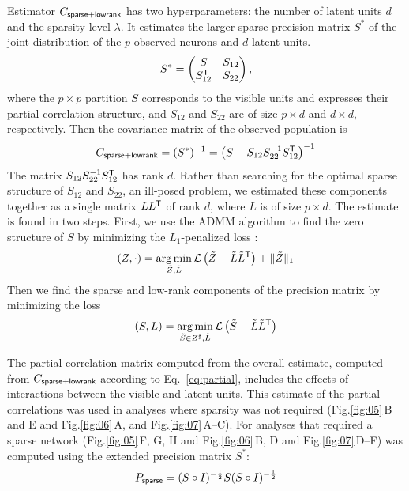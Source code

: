 \documentclass[10pt]{article}
\newcommand{\figref}[2]{Fig.\;\ref{fig:#1}\,#2}
\newcommand{\loss}[1]{\mathcal L\left(#1\right)}
\newcommand{\T}{{\sf T}}
\DeclareMathOperator*{\argmin}{arg\,min}
\begin{document}
Estimator $C_{\sf sparse+lowrank}$ has two hyperparameters: the number of latent units $d$ and the sparsity level $\lambda$. It estimates the larger sparse precision matrix $S^\ast$ of the joint distribution of the $p$ observed neurons and $d$ latent units.  
\begin{equation}
S^\ast=
\begin{pmatrix}
S & S_{12} \\
S_{12}^\T & S_{22}
\end{pmatrix},
\end{equation}
where the $p\times p$ partition $S$ corresponds to the visible units and expresses their partial correlation structure, and $S_{12}$ and $S_{22}$ are of size $p\times d$ and $d\times d$, respectively.
Then the covariance matrix of the observed population is 
\begin{equation}
C_{\sf sparse+lowrank} = (S^\ast)^{-1} = \left(S-S_{12}S_{22}^{-1}S_{12}^\T\right)^{-1}
\end{equation}
The matrix $ S_{12}S_{22}^{-1}S_{12}^\T$ has rank $d$. Rather than searching for the optimal sparse structure of $S_{12}$ and $S_{22}$, an ill-posed problem, we estimated these components together as a single matrix $LL^\T$ of rank $d$, where $L$ is of size $p\times d$.
The estimate is found in two steps. First, we use the ADMM algorithm to find the zero structure of $S$ by minimizing the $L_1$-penalized loss \cite{Chandrasekaran:2010,Ma:2013}:
\begin{equation}
(Z,\cdot) = \argmin\limits_{\tilde Z,\tilde L} \loss{\tilde Z-\tilde L\tilde L^\T} + \|\tilde Z\|_1
\end{equation}
Then we find the sparse and low-rank components of the precision matrix by minimizing the loss 
\begin{equation}
(S,L) = \argmin\limits_{\tilde S \in Z^\sharp,\tilde L} \loss{\tilde S-\tilde L \tilde L^\T}
\end{equation}

The partial correlation matrix computed from the overall estimate, computed from $C_{\sf sparse+lowrank}$ according to Eq.~\ref{eq:partial}, includes the effects of interactions between the visible and latent units.  This estimate of the partial correlations was used in analyses where sparsity was not required (\figref{05}{B and E} and \figref{06}{A}, and \figref{07}{A--C}).  For analyses that required a sparse network (\figref{05}{F, G, H} and \figref{06}{B, D} and \figref{07}{D--F}) was computed using the extended precision matrix $S^\ast$:
\begin{equation}
P_{\sf sparse} = (S\circ I)^{-\frac 1 2} S  (S\circ I)^{-\frac 1 2}
\end{equation}
\end{document}
